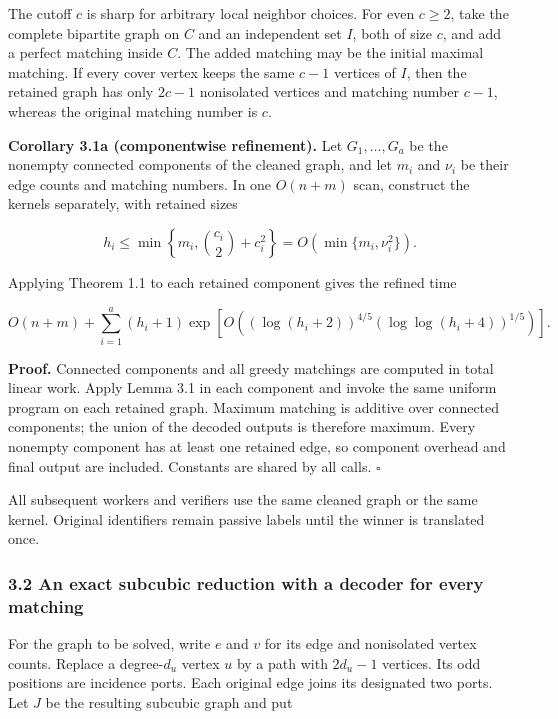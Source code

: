 The cutoff \(c\) is sharp for arbitrary local neighbor choices. For even \(c\geq2\), take the complete bipartite graph on \(C\) and an independent set \(I\), both of size \(c\), and add a perfect matching inside \(C\). The added matching may be the initial maximal matching. If every cover vertex keeps the same \(c-1\) vertices of \(I\), then the retained graph has only \(2c-1\) nonisolated vertices and matching number \(c-1\), whereas the original matching number is \(c\).

\textbf{Corollary 3.1a (componentwise refinement).} Let \(G_1,\ldots,G_a\) be the nonempty connected components of the cleaned graph, and let \(m_i\) and \(\nu_i\) be their edge counts and matching numbers. In one \(O(n+m)\) scan, construct the kernels separately, with retained sizes

\[
h_i\leq\min\left\{m_i,\binom{c_i}{2}+c_i^2\right\}
       =O(\min\{m_i,\nu_i^2\}).
\]

Applying Theorem 1.1 to each retained component gives the refined time

\[
O(n+m)+\sum_{i=1}^{a}(h_i+1)
 \exp\!\left[O\!\left(
   (\log(h_i+2))^{4/5}(\log\log(h_i+4))^{1/5}
 \right)\right].
\]

\textbf{Proof.} Connected components and all greedy matchings are computed in total linear work. Apply Lemma 3.1 in each component and invoke the same uniform program on each retained graph. Maximum matching is additive over connected components; the union of the decoded outputs is therefore maximum. Every nonempty component has at least one retained edge, so component overhead and final output are included. Constants are shared by all calls. \hfill\(\square\)

All subsequent workers and verifiers use the same cleaned graph or the same kernel. Original identifiers remain passive labels until the winner is translated once.

\hypertarget{af-46593eb93e-an-exact-subcubic-reduction-with-a-decoder-for-every-matching}{%
\subsubsection{3.2 An exact subcubic reduction with a decoder for every matching}\label{af-46593eb93e-an-exact-subcubic-reduction-with-a-decoder-for-every-matching}}

For the graph to be solved, write \(e\) and \(v\) for its edge and nonisolated vertex counts. Replace a degree-\(d_u\) vertex \(u\) by a path with \(2d_u-1\) vertices. Its odd positions are incidence ports. Each original edge joins its designated two ports. Let \(J\) be the resulting subcubic graph and put

